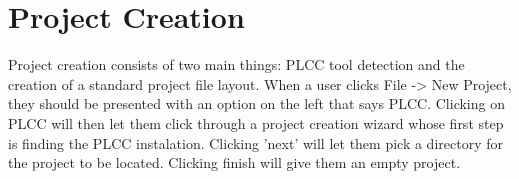 \documentclass[12pt]{article}
\begin{document}
{\section{Project Creation}
Project creation consists of two main things: PLCC tool detection and the creation of a standard project file layout.
When a user clicks File -> New Project, they should be presented with an option on the left that says PLCC.
Clicking on PLCC will then let them click through a project creation wizard whose first step is finding the PLCC instalation.
Clicking 'next' will let them pick a directory for the project to be located.
Clicking finish will give them an empty project.

\section{}





}
\end{document}
